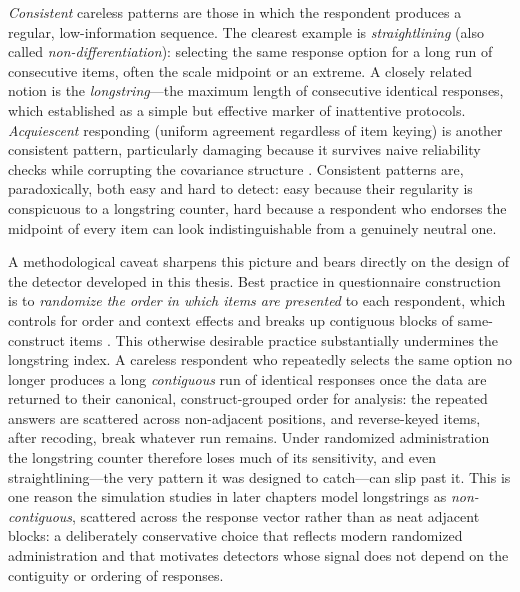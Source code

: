 \emph{Consistent} careless patterns are those in which the respondent produces
a regular, low-information sequence. The clearest example is
\emph{straightlining} (also called \emph{non-differentiation}): selecting the
same response option for a long run of consecutive items, often the scale
midpoint or an extreme. A closely related notion is the \emph{longstring}---the
maximum length of consecutive identical responses, which \textcite{johnson2005ascertaining}
established as a simple but effective marker of inattentive protocols.
\emph{Acquiescent} responding (uniform agreement regardless of item keying) is
another consistent pattern, particularly damaging because it survives naive
reliability checks while corrupting the covariance structure
\parencite{kam2015careless}. Consistent patterns are, paradoxically, both easy
and hard to detect: easy because their regularity is conspicuous to a longstring
counter, hard because a respondent who endorses the midpoint of every item can
look indistinguishable from a genuinely neutral one.

A methodological caveat sharpens this picture and bears directly on the design
of the detector developed in this thesis. Best practice in questionnaire
construction is to \emph{randomize the order in which items are presented} to
each respondent, which controls for order and context effects and breaks up
contiguous blocks of same-construct items \parencite{ward2023dealing}. This
otherwise desirable practice substantially undermines the longstring index. A
careless respondent who repeatedly selects the same option no longer produces a
long \emph{contiguous} run of identical responses once the data are returned to
their canonical, construct-grouped order for analysis: the repeated answers are
scattered across non-adjacent positions, and reverse-keyed items, after
recoding, break whatever run remains. Under randomized administration the
longstring counter therefore loses much of its sensitivity, and even
straightlining---the very pattern it was designed to catch---can slip past it.
This is one reason the simulation studies in later chapters model longstrings as
\emph{non-contiguous}, scattered across the response vector rather than as neat
adjacent blocks: a deliberately conservative choice that reflects modern
randomized administration and that motivates detectors whose signal does not
depend on the contiguity or ordering of responses.

